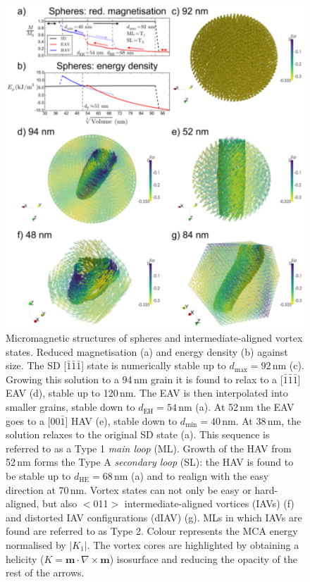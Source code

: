 \documentclass[review,authoryear]{elsarticle}
\newcommand{\dmax}{d_\text{max}}
\newcommand{\dmin}{d_\text{min}}
\newcommand{\nm}{\,\text{nm}}
\begin{document}
\begin{figure}[ht]
\centering
\includegraphics[width=\textwidth]{Figure_02.pdf}
\caption{Micromagnetic structures of spheres and intermediate-aligned vortex states. Reduced magnetisation (a) and energy density (b) against size. The SD [$\bar{1}\bar{1}\bar{1}$] state is numerically stable up to $\dmax=92\,\text{nm}$ (c). Growing this solution to a 94$\nm$ grain it is found to relax to a [$\bar{1}\bar{1}\bar{1}$] EAV (d), stable up to 120$\nm$. The EAV is then interpolated into smaller grains, stable down to $d_\text{EH}=54\,\text{nm}$ (a). At 52$\nm$ the EAV goes to a [00$\bar{1}$] HAV (e), stable down to $\dmin=40\,\text{nm}$. At 38$\nm$, the solution relaxes to the original SD state (a). This sequence is referred to as a Type 1 \textit{main loop} (ML). Growth of the HAV from 52$\nm$ forms the Type A \textit{secondary loop} (SL): the HAV is found to be stable up to $d_{\text{HE}}=68\,\text{nm}$ (a) and to realign with the easy direction at 70$\nm$. Vortex states can not only be easy or hard-aligned, but also $<$011$>$ intermediate-aligned vortices (IAVs) (f) and distorted IAV configurations (dIAV) (g). MLs in which IAVs are found are referred to as Type 2. Colour represents the MCA energy normalised by $|K_1|$. The vortex cores are highlighted by obtaining a helicity ($K=\boldsymbol{m}\cdot\nabla\times\boldsymbol{m}$) isosurface and reducing the opacity of the rest of the arrows.}
\label{fig2}
\end{figure}
\end{document}
